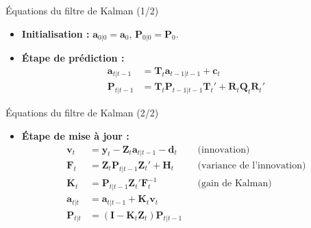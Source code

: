 \documentclass[11pt,aspectratio=169]{beamer}
\begin{document}
\begin{frame}{Équations du filtre de Kalman (1/2)}

\begin{itemize}

\item \textbf{Initialisation :} $\bm{a}_{0|0} = \bm{a}_0$, $\bm{P}_{0|0} = \bm{P}_0$.\newline

\item \textbf{Étape de prédiction :}
  \begin{align*}
  \bm{a}_{t|t-1} &= \bm{T}_t \bm{a}_{t-1|t-1} + \bm{c}_t \\
  \bm{P}_{t|t-1} &= \bm{T}_t \bm{P}_{t-1|t-1} \bm{T}_t' + \bm{R}_t \bm{Q}_t \bm{R}_t'
  \end{align*}

\end{itemize}

\end{frame}

\begin{frame}{Équations du filtre de Kalman (2/2)}

\begin{itemize}

\item \textbf{Étape de mise à jour :}
  \begin{align*}
  \bm{v}_t &= \bm{y}_t - \bm{Z}_t \bm{a}_{t|t-1} - \bm{d}_t & &\text{(innovation)} \\
  \bm{F}_t &= \bm{Z}_t \bm{P}_{t|t-1} \bm{Z}_t' + \bm{H}_t & &\text{(variance de l'innovation)} \\
  \bm{K}_t &= \bm{P}_{t|t-1} \bm{Z}_t' \bm{F}_t^{-1} & &\text{(gain de Kalman)} \\
  \bm{a}_{t|t} &= \bm{a}_{t|t-1} + \bm{K}_t \bm{v}_t \\
  \bm{P}_{t|t} &= (\bm{I} - \bm{K}_t \bm{Z}_t) \bm{P}_{t|t-1}
  \end{align*}

\end{itemize}

\end{frame}
\end{document}
